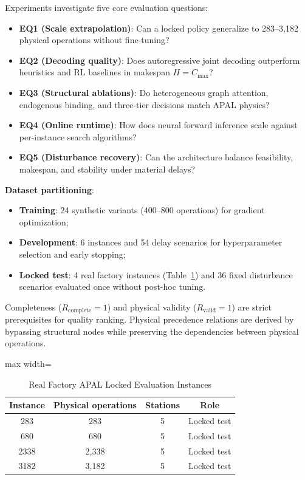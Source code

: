 \documentclass[journal,10pt]{IEEEtran}
\renewcommand{\arraystretch}{0.98}
\begin{document}
Experiments investigate five core evaluation questions:
\begin{itemize}
\item \textbf{EQ1 (Scale extrapolation)}: Can a locked policy generalize to 283--3,182 physical operations without fine-tuning?
\item \textbf{EQ2 (Decoding quality)}: Does autoregressive joint decoding outperform heuristics and RL baselines in makespan $H=C_{\max}$?
\item \textbf{EQ3 (Structural ablations)}: Do heterogeneous graph attention, endogenous binding, and three-tier decisions match APAL physics?
\item \textbf{EQ4 (Online runtime)}: How does neural forward inference scale against per-instance search algorithms?
\item \textbf{EQ5 (Disturbance recovery)}: Can the architecture balance feasibility, makespan, and stability under material delays?
\end{itemize}

\textbf{Dataset partitioning}:
\begin{itemize}
\item \textbf{Training}: 24 synthetic variants (400--800 operations) for gradient optimization;
\item \textbf{Development}: 6 instances and 54 delay scenarios for hyperparameter selection and early stopping;
\item \textbf{Locked test}: 4 real factory instances (Table~\ref{tab:instances}) and 36 fixed disturbance scenarios evaluated once without post-hoc tuning.
\end{itemize}
Completeness ($R_{\mathrm{complete}}=1$) and physical validity ($R_{\mathrm{valid}}=1$) are strict prerequisites for quality ranking. Physical precedence relations are derived by bypassing structural nodes while preserving the dependencies between physical operations.

\begin{table}[!t]
\centering
\caption{Real Factory APAL Locked Evaluation Instances}
\label{tab:instances}
\setlength{\tabcolsep}{6pt}
\renewcommand{\arraystretch}{0.98}
\begin{adjustbox}{max width=\columnwidth}
\begin{tabular}{@{}cccc@{}}
\toprule
\textbf{Instance} & \textbf{Physical operations} & \textbf{Stations} & \textbf{Role} \\
\midrule
283 & 283 & 5 & Locked test \\
680 & 680 & 5 & Locked test \\
2338 & 2,338 & 5 & Locked test \\
3182 & 3,182 & 5 & Locked test \\
\bottomrule
\end{tabular}
\end{adjustbox}
\vspace{2pt}
\par{}\par
\end{table}
\end{document}
